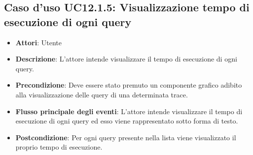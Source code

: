 \subsection{Caso d'uso UC12.1.5: Visualizzazione tempo di esecuzione di ogni query}
\begin{itemize}
	\item \textbf{Attori}: Utente
	\item \textbf{Descrizione}: L'attore intende visualizzare il tempo di esecuzione di ogni query.
	\item \textbf{Precondizione}: Deve essere stato premuto un componente grafico adibito alla visualizzazione delle query di una determinata trace.
	\item \textbf{Flusso principale degli eventi}: L'attore intende visualizzare il tempo di esecuzione di ogni query ed esso viene rappresentato sotto forma di testo.
	\item \textbf{Postcondizione}: Per ogni query presente nella lista viene visualizzato il proprio tempo di esecuzione.
\end{itemize}

 \hypertarget{UC13}{}
